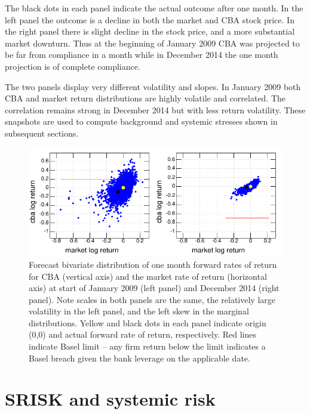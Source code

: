 \documentclass[12pt]{article}
\begin{document}
 The black dots in each panel indicate the actual outcome after one month.    In the left panel the outcome is a decline in both  the market and CBA stock price.    In the right panel there is slight decline in the stock price, and a more substantial market downturn.    Thus at the beginning of January  2009 CBA was projected to be far from compliance in a month while in December 2014 the one month projection is of complete compliance.

 The two panels  display very different volatility and slopes. In January 2009 both CBA and market return distributions are highly volatile and correlated. The correlation remains strong in December 2014 but with less return volatility. These snapshots are used to compute background and systemic stresses shown in subsequent sections.

\begin{figure}[htbp]
\begin{center}
\includegraphics{figures/simulation.pdf}
\caption{Forecast bivariate distribution of one month forward rates of return   for CBA (vertical axis) and the market rate of return (horizontal axis) at start of January 2009 (left panel)  and December 2014 (right panel). Note scales in both panels are the same, the relatively large volatility in the left panel, and the left skew in the  marginal distributions.  Yellow and black dots in each panel indicate origin (0,0) and  actual forward  rate of return, respectively.   Red lines indicate Basel limit -- any firm return below the limit indicates a Basel breach given the bank leverage on the applicable date.}
\label{simulation}
\end{center}
\end{figure}

\section{SRISK and systemic risk}\label{srisk}
\end{document}

